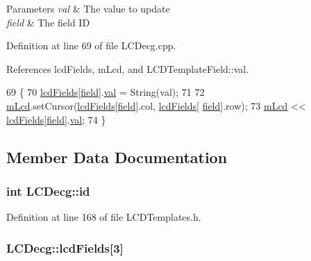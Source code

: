 \begin{DoxyParams}{Parameters}
{\em val} & The value to update \\
\hline
{\em field} & The field I\-D \\
\hline
\end{DoxyParams}


Definition at line 69 of file L\-C\-Decg.\-cpp.



References lcd\-Fields, m\-Lcd, and L\-C\-D\-Template\-Field\-::val.


\begin{DoxyCode}
69                                              \{
70   \hyperlink{class_l_c_decg_ab782889913185a822ee73c382ccff484}{lcdFields}[\hyperlink{_l_c_d_templates_8h_a20a49e010fbfc3a43959f12d92e01bb6}{field}].\hyperlink{struct_l_c_d_template_field_a6eb7ce0547fc28ac3a2538f0fac3f117}{val} = String(val);
71 
72   \hyperlink{class_l_c_decg_aca5f4b83f22c46ed313265f02feebb2a}{mLcd}.setCursor(\hyperlink{class_l_c_decg_ab782889913185a822ee73c382ccff484}{lcdFields}[\hyperlink{struct_l_c_d_template_field}{field}].col, \hyperlink{class_l_c_decg_ab782889913185a822ee73c382ccff484}{lcdFields}[
      \hyperlink{struct_l_c_d_template_field}{field}].row);
73   \hyperlink{class_l_c_decg_aca5f4b83f22c46ed313265f02feebb2a}{mLcd} << \hyperlink{class_l_c_decg_ab782889913185a822ee73c382ccff484}{lcdFields}[\hyperlink{_l_c_d_templates_8h_a20a49e010fbfc3a43959f12d92e01bb6}{field}].\hyperlink{struct_l_c_d_template_field_a6eb7ce0547fc28ac3a2538f0fac3f117}{val};
74 \}
\end{DoxyCode}


\subsection{Member Data Documentation}
\hypertarget{class_l_c_decg_a2de8fa6918dc9b61eeb0bd0b2cebe0dc}{
\subsubsection[{id}]{\setlength{\rightskip}{0pt plus 5cm}int L\-C\-Decg\-::id}}\label{class_l_c_decg_a2de8fa6918dc9b61eeb0bd0b2cebe0dc}


Definition at line 168 of file L\-C\-D\-Templates.\-h.

\hypertarget{class_l_c_decg_ab782889913185a822ee73c382ccff484}{
\subsubsection[{lcd\-Fields}]{ L\-C\-Decg\-::lcd\-Fields\mbox{[}3\mbox{]}}}\label{class_l_c_decg_ab782889913185a822ee73c382ccff484}


